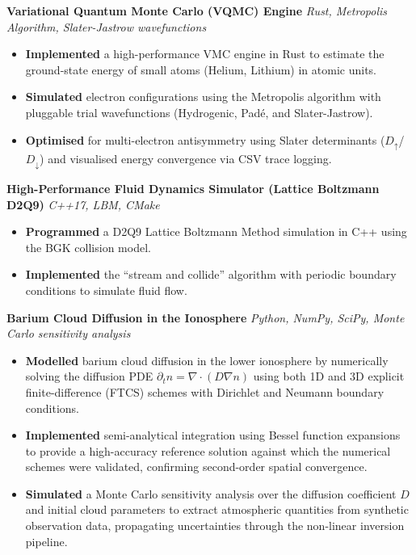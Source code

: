 \documentclass[10pt, a4paper]{article}
\newenvironment{project}[2]{%
  \textbf{\color{accent}#1} \hfill
  \small\textit{\color{light}#2}%
  \begin{itemize}%
}{%
  \end{itemize}%
  \vspace{2pt}%
}
\begin{document}
\begin{project}{Variational Quantum Monte Carlo (VQMC) Engine}{Rust, Metropolis Algorithm, Slater-Jastrow wavefunctions}
  \item \textbf{Implemented} a high-performance VMC engine in Rust to estimate the ground-state energy of small atoms (Helium, Lithium) in atomic units.
  \item \textbf{Simulated} electron configurations using the Metropolis algorithm with pluggable trial wavefunctions (Hydrogenic, Pad\'{e}, and Slater-Jastrow).
  \item \textbf{Optimised} for multi-electron antisymmetry using Slater determinants ($D_{\uparrow}$/$D_{\downarrow}$) and visualised energy convergence via CSV trace logging.
\end{project}

\begin{project}{High-Performance Fluid Dynamics Simulator (Lattice Boltzmann D2Q9)}{C++17, LBM, CMake}
  \item \textbf{Programmed} a D2Q9 Lattice Boltzmann Method simulation in C++ using the BGK collision model.
  \item \textbf{Implemented} the ``stream and collide'' algorithm with periodic boundary conditions to simulate fluid flow.
\end{project}

\begin{project}{Barium Cloud Diffusion in the Ionosphere}{Python, NumPy, SciPy, Monte Carlo sensitivity analysis}
  \item \textbf{Modelled} barium cloud diffusion in the lower ionosphere by numerically solving the
        diffusion PDE $\partial_t n = \nabla\cdot(D\nabla n)$ using both 1D and 3D explicit
        finite-difference (FTCS) schemes with Dirichlet and Neumann boundary conditions.
  \item \textbf{Implemented} semi-analytical integration using Bessel function expansions to provide
        a high-accuracy reference solution against which the numerical schemes were validated,
        confirming second-order spatial convergence.
  \item \textbf{Simulated} a Monte Carlo sensitivity analysis over the diffusion coefficient $D$
        and initial cloud parameters to extract atmospheric quantities from synthetic observation
        data, propagating uncertainties through the non-linear inversion pipeline.
\end{project}
\end{document}
